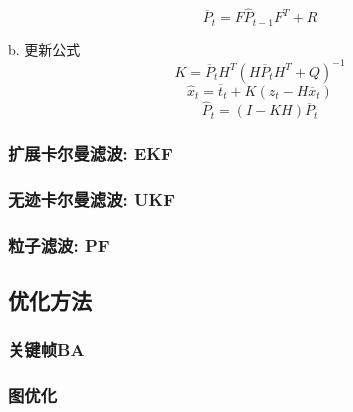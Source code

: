 \begin{equation}
  \overline{P}_t=F\hat{P}_{t-1}F^T+R
\end{equation}
\par {b. 更新公式}
\begin{equation}
  K=\overline{P}_t H^T(H \overline{P}_t H^T + Q)^{-1}
\end{equation}
\begin{equation}
  \hat{x}_t=\overline{t}_t+K(z_t-H \overline{x}_t)
\end{equation}
\begin{equation}
  \hat{P}_t=(I-K H)\overline{P}_t
\end{equation}
\subsubsection*{扩展卡尔曼滤波: EKF}
\subsubsection*{无迹卡尔曼滤波: UKF}
\subsubsection*{粒子滤波: PF}
\subsection{优化方法}
\subsubsection{关键帧BA}
\subsubsection{图优化}






